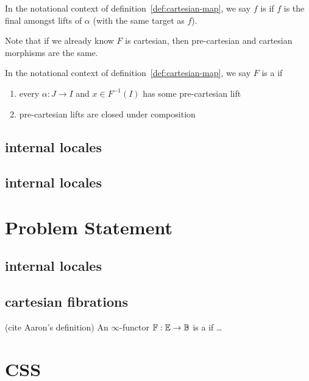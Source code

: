 \documentclass[./main.tex]{subfiles}
\begin{document}
\begin{definition}
In the notational context of definition~\ref{def:cartesian-map}, we say $f$ is  if $f$ is the final amongst lifts of $\alpha$ (with the same target as $f$).
\end{definition}
Note that if we already know $F$ is cartesian, then pre-cartesian and cartesian morphisms are the same.
\begin{definition}
  In the notational context of definition~\ref{def:cartesian-map}, we say $F$ is a  if
  \begin{enumerate}
    \item every $\alpha: J \to I$ and $x\in F^{-1}(I)$ has some pre-cartesian lift
      \item pre-cartesian lifts are closed under composition
  \end{enumerate}
\end{definition}


\subsection{internal locales}
\subsection{internal locales}


\section{Problem Statement}
\subsection{internal locales}
\subsection{cartesian fibrations}
\begin{definition}(cite Aaron's definition)
  An $\infty$-functor $\mathbb{F}:\mathbb{E} \to \mathbb{B}$ is a  if \ldots
\end{definition}
  \section{CSS}
\end{document}
